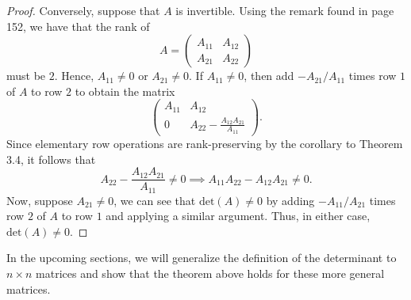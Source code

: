 \begin{proof}
 Conversely, suppose that \( A  \) is invertible. Using the remark found in page 152, we have that the rank of 
 \[ A = \begin{pmatrix}
     {A}_{11} & {A}_{12} \\
     {A}_{21} & {A}_{22}
 \end{pmatrix}  \] must be \( 2  \). Hence, \( {A}_{11} \neq  0  \) or \( {A}_{21} \neq 0  \). If \( {A}_{11} \neq 0  \), then add \( - {A}_{21} / {A}_{11} \) times row \( 1  \) of \( A  \) to row \( 2 \) to obtain the matrix
 \[  \begin{pmatrix}
     {A}_{11} & {A}_{12} \\
     0 & {A}_{22} - \frac{ {A}_{12} {A}_{21}  }{ {A}_{11} } 
 \end{pmatrix}. \]
 Since elementary row operations are rank-preserving by the corollary to Theorem 3.4, it follows that
 \[  {A}_{22} - \frac{ {A}_{12} {A}_{21}  }{  {A}_{11} }  \neq  0 \implies {A}_{11} {A}_{22} - {A}_{12} {A}_{21} \neq 0.  \]
 Now, suppose \( {A}_{21} \neq  0  \), we can see that \( \text{det}(A) \neq  0  \) by adding \( - {A}_{11} / {A}_{21} \) times row \( 2  \) of \( A  \) to row \( 1  \) and applying a similar argument. Thus, in either case, \( \text{det}(A) \neq  0 \).
 
\end{proof}

In the upcoming sections, we will generalize the definition of the determinant to \( n \times n  \) matrices and show that the theorem above holds for these more general matrices.
